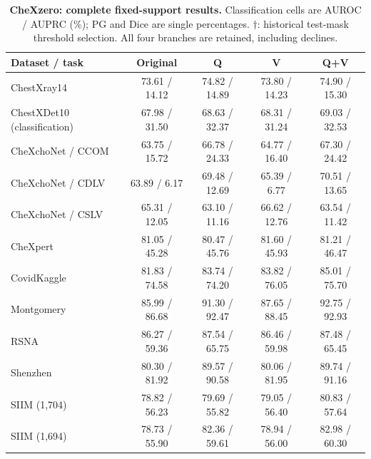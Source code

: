 \begin{table}[tp]
\centering
\caption{\textbf{CheXzero: complete fixed-support results.} Classification cells are AUROC / AUPRC (\%); PG and Dice are single percentages. $\dagger$: historical test-mask threshold selection. All four branches are retained, including declines.}
\label{tab:supp-fixed-chexzero}
\small
\setlength{\tabcolsep}{4pt}
\begin{tabular*}{\textwidth}{@{\extracolsep{\fill}}lcccc@{}}
\toprule
Dataset / task & Original & Q & V & Q+V \\
\midrule
ChestXray14 & 73.61 / 14.12 & 74.82 / 14.89 & 73.80 / 14.23 & 74.90 / 15.30 \\
ChestXDet10 (classification) & 67.98 / 31.50 & 68.63 / 32.37 & 68.31 / 31.24 & 69.03 / 32.53 \\
CheXchoNet / CCOM & 63.75 / 15.72 & 66.78 / 24.33 & 64.77 / 16.40 & 67.30 / 24.42 \\
CheXchoNet / CDLV & 63.89 / 6.17 & 69.48 / 12.69 & 65.39 / 6.77 & 70.51 / 13.65 \\
CheXchoNet / CSLV & 65.31 / 12.05 & 63.10 / 11.16 & 66.62 / 12.76 & 63.54 / 11.42 \\
CheXpert & 81.05 / 45.28 & 80.47 / 45.76 & 81.60 / 45.93 & 81.21 / 46.47 \\
CovidKaggle & 81.83 / 74.58 & 83.74 / 74.20 & 83.82 / 76.05 & 85.01 / 75.70 \\
Montgomery & 85.99 / 86.68 & 91.30 / 92.47 & 87.65 / 88.45 & 92.75 / 92.93 \\
RSNA & 86.27 / 59.36 & 87.54 / 65.75 & 86.46 / 59.98 & 87.48 / 65.45 \\
Shenzhen & 80.30 / 81.92 & 89.57 / 90.58 & 80.06 / 81.95 & 89.74 / 91.16 \\
SIIM (1,704) & 78.82 / 56.23 & 79.69 / 55.82 & 79.05 / 56.40 & 80.83 / 57.64 \\
SIIM (1,694) & 78.73 / 55.90 & 82.36 / 59.61 & 78.94 / 56.00 & 82.98 / 60.30 \\
\bottomrule
\end{tabular*}
\end{table}

